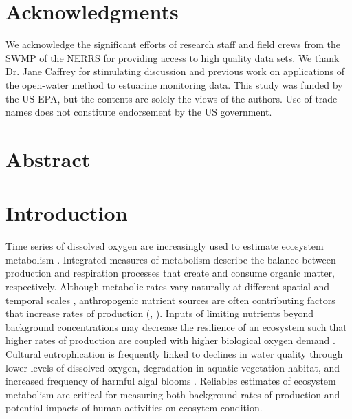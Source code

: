 \documentclass[letterpaper,12pt,oneside]{article}\usepackage[]{graphicx}\usepackage[]{color}
\begin{document}
\raggedbottom
\linenumbers
\raggedright
{}
\setlength{\parindent}{0.5in}
\renewcommand\refname{References \vspace{12pt}}



\section{Acknowledgments}

We acknowledge the significant efforts of research staff and field crews from the \acl{SWMP} of the \acl{NERRS} for providing access to high quality data sets.  We thank Dr. Jane Caffrey for stimulating discussion and previous work on applications of the open-water method to estuarine monitoring data. This study was funded by the US \acl{EPA}, but the contents are solely the views of the authors.  Use of trade names does not constitute endorsement by the US government.

\newpage
\section{Abstract}


\acresetall
\clearpage

\section{Introduction} \label{intro}

Time series of dissolved oxygen are increasingly used to estimate ecosystem metabolism \citep{Kemp12,Needoba12}.  Integrated measures of metabolism describe the balance between production and respiration processes that create and consume organic matter, respectively.  Although metabolic rates vary naturally at different spatial and temporal scales \citep{Ziegler98,Caffrey04,Russell07}, anthropogenic nutrient sources are often contributing factors that increase rates of production (\citealt{Nixon95}, ).  Inputs of limiting nutrients beyond background concentrations may decrease the resilience of an ecosystem such that higher rates of production are coupled with higher biological oxygen demand \citep{Yin04,Kemp09}.  Cultural eutrophication is frequently linked to declines in water quality through lower levels of dissolved oxygen, degradation in aquatic vegetation habitat, and increased frequency of harmful algal blooms \citep{Cloern96,Short96,Rabalais02,Diaz08}.  Reliables estimates of ecosystem metabolism are critical for measuring both background rates of production and potential impacts of human activities on ecosytem condition.     
\end{document}
